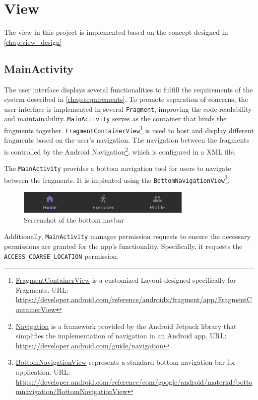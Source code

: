 \section{View}
\label{chap:view_impl}
The view in this project is implemented based on the concept designed in \autoref{chap:view_design}
\subsection{MainActivity}
The user interface displays several functionalities to fulfill the requirements of the system described in \autoref{chap:requirements}. To promote separation of concerns, the user interface is implemented in several \texttt{Fragment}, improving the code readability and maintainability.  
\texttt{MainActivity} serves as the container that binds the fragments together. \texttt{FragmentContainerView}\footnote{\url{FragmentContainerView} is a customized Layout designed specifically for Fragments. URL: \url{https://developer.android.com/reference/androidx/fragment/app/FragmentContainerView}} is used to host and display different fragments based on the user's navigation.
The navigation between the fragments is controlled by the Android Navigation\footnote{\url{Navigation} is a framework provided by the Android Jetpack library that simplifies the implementation of navigation in an Android app. URL: \url{https://developer.android.com/guide/navigation}}, which is configured in a XML file. 

The \texttt{MainActivity} provides a bottom navigation tool for users to navigate between the fragments. It is implented using the \texttt{BottomNavigationView}\footnote{\url{BottomNavigationView} represents a standard bottom navigation bar for application. URL: \url{https://developer.android.com/reference/com/google/android/material/bottomnavigation/BottomNavigationView}}.
\begin{figure}[H]
    \centering
    \includegraphics[width=0.75\textwidth]{images/bottom-navbar.png}
    \caption{Screenshot of the bottom navbar}
    \label{fig:bottom_navbar}
\end{figure}

Additionally, \texttt{MainActivity} manages permission requests to ensure the necessary permissions are granted for the app's functionality. Specifically, it requests the \texttt{ACCESS\_COARSE\_LOCATION} permission.

